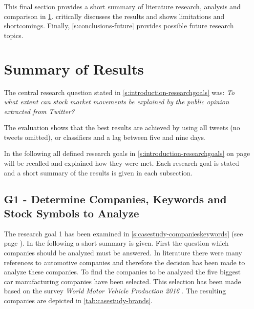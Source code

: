This final section provides a short summary of literature research, analysis and comparison in \cref{s:conclusions-summary}.
 critically discusses the results and shows limitations and shortcomings. 
Finally, \cref{s:conclusions-future} provides possible future research topics.

\section{Summary of Results}
\label{s:conclusions-summary}

The central research question stated in \cref{s:introduction-researchgoals} was: \emph{To what extent can stock market movements be explained by the public opinion extracted from Twitter?}

The evaluation shows that the best results are achieved by using all tweets (no tweets omitted), \svm{} or \nb{} classifiers and a lag between five and nine days.

In the following all defined research goals in \cref{s:introduction-researchgoals} on page \pageref{s:introduction-researchgoals} will be recalled and explained how they were met.
Each research goal is stated and a short summary of the results is given in each subsection.


\subsection{G1 - Determine Companies, Keywords and Stock Symbols to Analyze}
\label{ss:conclusion-summary-g1}


The research goal 1 has been examined in \cref{s:casestudy-companieskeywords} (see page \pageref{s:casestudy-companieskeywords}).
In the following a short summary is given.
First the question which companies should be analyzed must be answered.
In literature there were many references to automotive companies and therefore the decision has been made to analyze these companies.
To find the companies to be analyzed the five biggest car manufacturing companies have been selected.
This selection has been made based on the survey \emph{World Motor Vehicle Production 2016} \citep{OICA2016}. 
The resulting companies are depicted in \cref{tab:casestudy-brands}.

